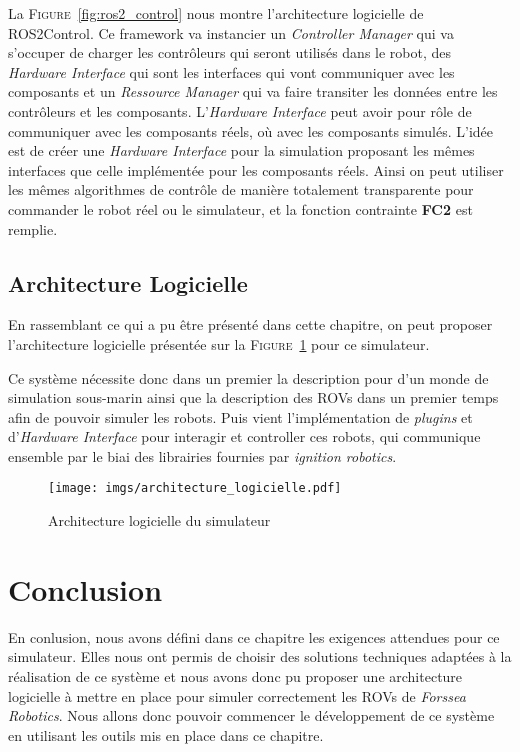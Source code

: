             La \textsc{Figure}~\ref{fig:ros2_control} nous montre l'architecture logicielle de \gls{ROS2Control}. Ce framework va instancier un \textit{Controller Manager} qui va s'occuper de charger les contrôleurs qui seront utilisés dans le robot, des \textit{Hardware Interface} qui sont les interfaces qui vont communiquer avec les composants et un \textit{Ressource Manager} qui va faire transiter les données entre les contrôleurs et les composants. L'\textit{Hardware Interface} peut avoir pour rôle de communiquer avec les composants réels, où avec les composants simulés. L'idée est de créer une \textit{Hardware Interface} pour la simulation proposant les mêmes interfaces que celle implémentée pour les composants réels. Ainsi on peut utiliser les mêmes algorithmes de contrôle de manière totalement transparente pour commander le robot réel ou le simulateur, et la fonction contrainte \textbf{FC2} est remplie.

        \subsection{Architecture Logicielle}

            En rassemblant ce qui a pu être présenté dans cette chapitre, on peut proposer l'architecture logicielle présentée sur la \textsc{Figure}~\ref{fig:architecture_logicielle} pour ce simulateur.
            
            Ce système nécessite donc dans un premier la description pour \gazebo{} d'un monde de simulation sous-marin ainsi que la description des \gls{ROV}s dans un premier temps afin de pouvoir simuler les robots. Puis vient l'implémentation de \textit{plugins} \gazebo{} et d'\textit{Hardware Interface} pour interagir et controller ces robots, qui communique ensemble par le biai des librairies fournies par \textit{ignition robotics}.
            
            \begin{figure}[!htb]
                \centering
                \texttt{[image: imgs/architecture\_logicielle.pdf]}
                \caption{Architecture logicielle du simulateur}
                \label{fig:architecture_logicielle}
            \end{figure}

    \section{Conclusion}

        En conlusion, nous avons défini dans ce chapitre les exigences attendues pour ce simulateur. Elles nous ont permis de choisir des solutions techniques adaptées à la réalisation de ce système et nous avons donc pu proposer une architecture logicielle à mettre en place pour simuler correctement les \gls{ROV}s de \textit{Forssea Robotics}. Nous allons donc pouvoir commencer le développement de ce système en utilisant les outils mis en place dans ce chapitre.
        